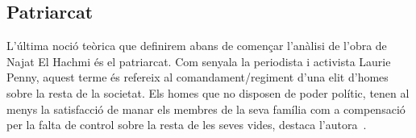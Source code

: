 \begin{comment}
quote Spivak in Segarra
"cualquier intento de ayudar a los subalternos tropieza con problemas éticos impo-
sibles de soslayar: la tendencia a considerarlos como una masa homogénea, en
lugar de fijarse en su singularidad heterogénea y, en especial, la intención benevo-
lente de querer hablar por ellos, lo cual significa un acto de apropiación, y no con
ellos. (Segarra 2006)"
Segarra, Marta (2006). «Más allá del poscolonialismo. Contra la subalternidad», La Van-
guardia, 1-3-2006.

«All speaking, even seemingly the most
immediate, entails a distanced decipherment by another, which is, at best,
an interception.» (Spivak 1999: 309).

"El lenguaje se utiliza en este
ejemplo como un instrumento de poder que ya no se basa en un ideal armónico
de comunidad en el que prevalece el principio de cooperación."


\end{comment}

\subsection{Patriarcat}
L'última noció teòrica que definirem abans de començar l'anàlisi de l'obra de Najat El Hachmi és el patriarcat.
Com senyala la periodista i activista Laurie Penny, aquest terme és refereix al comandament/regiment d'una elit d'homes sobre la resta de la societat.
Els homes que no disposen de poder polític, tenen al menys la satisfacció de manar els membres de la seva família com a compensació per la falta de control sobre la resta de les seves vides, destaca l'autora~\autocite[69-70]{Penny2014}.


